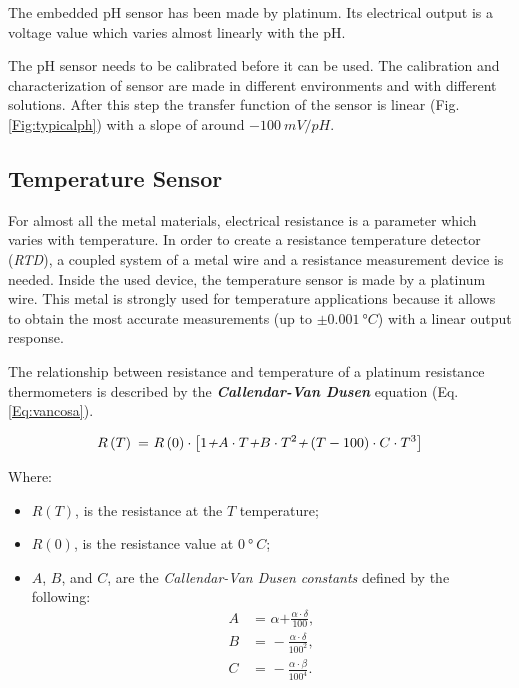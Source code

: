  The embedded pH sensor has been made by platinum. Its electrical output is a voltage value which varies almost linearly with the pH.
 
 The pH sensor needs to be calibrated before it can be used. The calibration and characterization of sensor are made in different environments and with different solutions. After this step the transfer function of the sensor is linear (Fig.\ref{Fig:typicalph}) with a slope of around $- 100\ mV/pH$.
 \subsection{Temperature Sensor}\label{sec:sensorT}
 
 For almost all the metal materials, electrical resistance is a parameter which varies with temperature. In order to create a resistance temperature detector (\textit{RTD}), a coupled system of a metal wire and a resistance measurement device is needed. Inside the used device, the temperature sensor is made by a platinum wire. This metal is strongly used for temperature applications because it allows to obtain the most accurate measurements (up to $\pm 0.001\ \text{°}C$) with a linear output response.
 
 The relationship between resistance and temperature of a platinum resistance thermometers is described by the \textit{\textbf{Callendar-Van Dusen}} equation (Eq.\ref{Eq:vancosa}).
 
 \begin{equation}
 R\left(T\right) \text{ = } R\left(0\right) \cdot \left[1 \text{\textit{+}} A\cdot T \text{\textit{+}} B \cdot T^2 \text{\textit{+}} \left(T-100\right)\cdot C \cdot T^3\right]  \label{Eq:vancosa} \end{equation}
 
 Where:
 \begin{itemize}
 	\item $R\left(T\right)$, is the resistance at the $T$ temperature;
 	\item $R\left(0\right)$, is the resistance value at $0\ \text{°}\ C$;
 	\item $A$, $B$, and $C$, are the \textit{Callendar-Van Dusen constants} defined by the following:\begin{subequations} \begin{align} 	A &\text{ = }\alpha \text{+} \frac{\alpha\cdot\delta}{100},\\B &\text{ = } - \frac{\alpha\cdot\delta}{100^2},\\ 	C &\text{ = } - \frac{\alpha\cdot\beta}{100^4}. \end{align} \end{subequations}
 \end{itemize}

